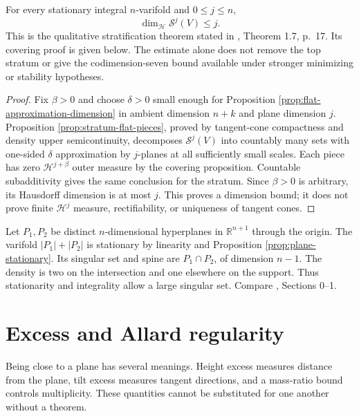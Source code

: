 \begin{theorem}\label{thm:strata-dimension}
For every stationary integral $n$-varifold and $0\leq j\leq n$,
\[
 \dim_{\mathcal H}\mathcal S^j(V)\leq j.
\]
This is the qualitative stratification theorem stated in \cite{Minter}, Theorem 1.7, p.~17. Its covering proof is given below. The estimate alone does not remove the top stratum or give the codimension-seven bound available under stronger minimizing or stability hypotheses.
\end{theorem}
\begin{proof}
Fix $\beta>0$ and choose $\delta>0$ small enough for Proposition \ref{prop:flat-approximation-dimension} in ambient dimension $n+k$ and plane dimension $j$. Proposition \ref{prop:stratum-flat-pieces}, proved by tangent-cone compactness and density upper semicontinuity, decomposes $\mathcal S^j(V)$ into countably many sets with one-sided $\delta$ approximation by $j$-planes at all sufficiently small scales. Each piece has zero $\mathcal H^{j+\beta}$ outer measure by the covering proposition. Countable subadditivity gives the same conclusion for the stratum. Since $\beta>0$ is arbitrary, its Hausdorff dimension is at most $j$. This proves a dimension bound; it does not prove finite $\mathcal H^j$ measure, rectifiability, or uniqueness of tangent cones.
\end{proof}


\begin{example}\label{ex:crossing-planes}
Let $P_1,P_2$ be distinct $n$-dimensional hyperplanes in $\mathbb R^{n+1}$ through the origin. The varifold $|P_1|+|P_2|$ is stationary by linearity and Proposition \ref{prop:plane-stationary}. Its singular set and spine are $P_1\cap P_2$, of dimension $n-1$. The density is two on the intersection and one elsewhere on the support. Thus stationarity and integrality allow a large singular set. Compare \cite{Minter}, Sections 0--1.
\end{example}

\chapter{Excess and Allard regularity}\label{sec:allard-regularity}
Being close to a plane has several meanings. Height excess measures distance from the plane, tilt excess measures tangent directions, and a mass-ratio bound controls multiplicity. These quantities cannot be substituted for one another without a theorem.

